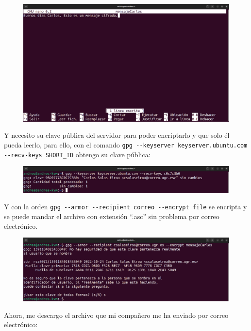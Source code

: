 \documentclass{article}
\begin{document}
\begin{figure}[H]
    \includegraphics[width=\textwidth]{imagenes/Portatil/Captura desde 2022-10-24 12-02-33.png}
\end{figure}

Y necesito su clave pública del servidor para poder encriptarlo y que solo él pueda leerlo, para ello, con el comando \verb|gpg --keyserver keyserver.ubuntu.com --recv-keys SHORT_ID| obtengo su clave pública:

\begin{figure}[H]
    \includegraphics[width=\textwidth]{imagenes/Portatil/Captura desde 2022-10-24 12-11-03.png}
\end{figure}

Y con la orden \verb|gpg --armor --recipient correo --encrypt file| se encripta y se puede mandar el archivo con extensión ``.asc'' sin problema por correo electrónico.

\begin{figure}[H]
    \includegraphics[width=\textwidth]{imagenes/Portatil/Captura desde 2022-10-24 12-11-31.png}
\end{figure}

Ahora, me descargo el archivo que mi compañero me ha enviado por correo electrónico:
\end{document}
